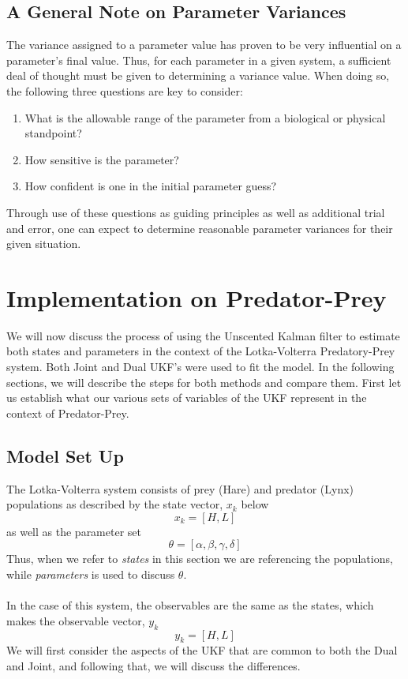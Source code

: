 \subsection{A General Note on Parameter Variances}
The variance assigned to a parameter value has proven to be very influential on a parameter's final value. Thus, for each parameter in a given system, a sufficient deal of thought must be given to determining a variance value. When doing so, the following three questions are key to consider:
\begin{enumerate}
    \item What is the allowable range of the parameter from a biological or physical standpoint?
    \item How sensitive is the parameter?
    \item How confident is one in the initial parameter guess?
\end{enumerate}
Through use of these questions as guiding principles as well as additional trial and error, one can expect to determine reasonable parameter variances for their given situation.


\section{Implementation on Predator-Prey}
We will now discuss the process of using the Unscented Kalman filter to estimate both states and parameters in the context of the Lotka-Volterra Predatory-Prey system. Both Joint and Dual UKF's were used to fit the model. In the following sections, we will describe the steps for both methods and compare them. First let us establish what our various sets of variables of the UKF represent in the context of Predator-Prey.

\subsection{Model Set Up}
The Lotka-Volterra system consists of prey (Hare) and predator (Lynx) populations as described by the state vector, $x_k$ below \\
$$x_k = [H, L]$$
as well as the parameter set
$$ \theta = [\alpha, \beta, \gamma, \delta] $$
Thus, when we refer to \emph{states} in this section we are referencing the populations, while \emph{parameters} is used to discuss $\theta$. \\
\\
In the case of this system, the observables are the same as the states, which makes the observable vector, $y_k$
$$y_k = [H, L]$$
We will first consider the aspects of the UKF that are common to both the Dual and Joint, and following that, we will discuss the differences.

